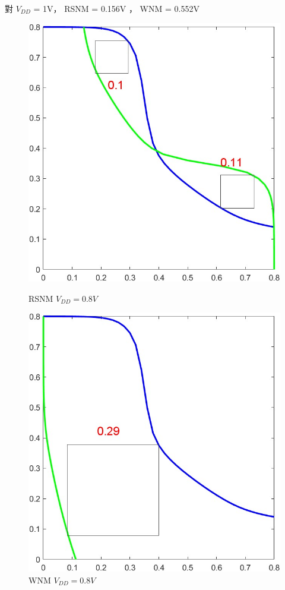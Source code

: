 \documentclass{article}
\begin{document}
\vspace*{-1cm}
對 $V_{DD}$ = 1V， RSNM = 0.156V ， WNM = 0.552V

\begin{figure}[H]
\centering
\begin{minipage}[t]{0.28\textwidth}
\centering
    \includegraphics[width=\textwidth]{./img/2023-11-12-01-10-07.png}
\caption{RSNM $V_{DD} = 0.8V$}
\label{rsnm08}
\end{minipage}
\qquad
\begin{minipage}[t]{0.28\textwidth}
\centering
    \includegraphics[width=\textwidth]{./img/2023-11-12-01-11-11.png}
\caption{WNM $V_{DD} = 0.8V$}
\label{wnm08}
\end{minipage}
\end{figure}
\end{document}
